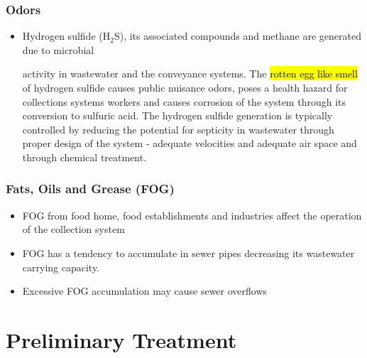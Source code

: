 \subsection{Odors}
\begin{itemize}
\item Hydrogen sulfide (H$_2$S), its associated compounds and methane are generated due to microbial

 activity in wastewater and the conveyance systems.  The \hl{rotten egg like smell} of hydrogen sulfide causes public nuisance odors, poses a health hazard for collections systems workers and causes corrosion of the system through its conversion to sulfuric acid.  The hydrogen sulfide generation is typically controlled by reducing the potential for septicity in wastewater through proper design of the system -  adequate velocities and adequate air space and through chemical treatment.
 \end{itemize}

\subsection{Fats, Oils and Grease (FOG)}
\begin{itemize}
\item FOG from food home, food establishments and industries affect the operation of the collection system
\item FOG has a tendency to accumulate in sewer pipes decreasing its wastewater carrying capacity.
\item Excessive FOG accumulation may cause sewer overflows
 \end{itemize}
 


\chapter{Preliminary Treatment}



